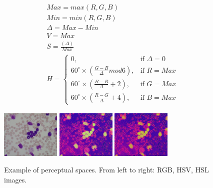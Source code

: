 \begin{equation}\label{HSV}
\begin{split}
&Max = max(R, G, B)\\
&Min = min(R, G, B)\\
&\Delta = Max-Min\\
&V = Max\\
&S = \frac{(\Delta)}{Max}\\
&H = \begin{cases} 0, & \mbox{if   } \Delta = 0 \\ 60^\circ \times \left (\frac{G-B}{\Delta} mod6 \right ), & \mbox{if   } R = Max \\  
60^\circ \times \left ( \frac{B-R}{\Delta} + 2 \right ), & \mbox{if   } G = Max\\ 
60^\circ \times \left ( \frac{R-G}{\Delta} + 4 \right ), & \mbox{if   } B = Max\end{cases} 
\end{split}
\end{equation}

\begin{figure}[h]
	\centering
	\includegraphics[width=0.25\textwidth]{images/figcs_rgb}
	\includegraphics[width=0.25\textwidth]{images/figcs_hsv}
	\includegraphics[width=0.25\textwidth]{images/figcs_hsl}
	\caption[Example of perceptual spaces.]{\label{fig:colour_spaces_per}Example of perceptual spaces. From left to right: RGB, HSV, HSL images.}
\end{figure}

